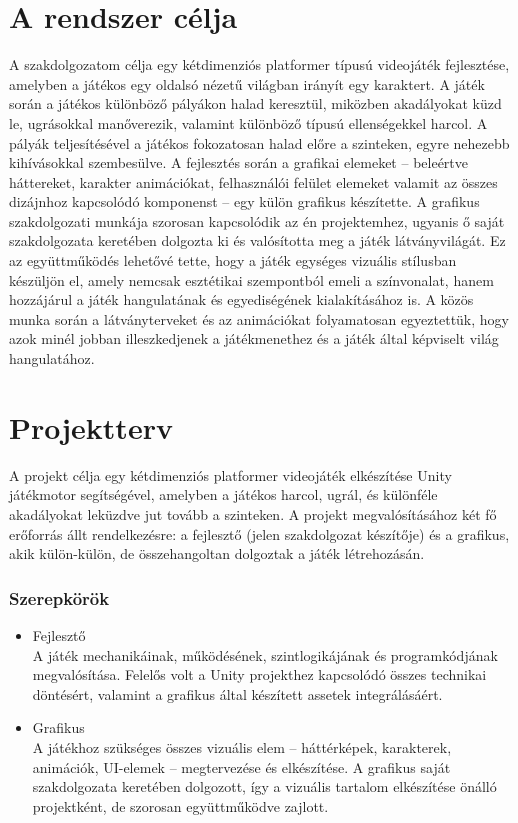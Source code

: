 \documentclass[
]{thesis-ekf}
\theoremstyle{definition}
\theoremstyle{remark}
\begin{document}
\section{A rendszer célja}
A szakdolgozatom célja egy kétdimenziós platformer típusú videojáték fejlesztése, amelyben a játékos egy oldalsó nézetű világban irányít egy karaktert. A játék során a játékos különböző pályákon halad keresztül, miközben akadályokat küzd le, ugrásokkal manőverezik, valamint különböző típusú ellenségekkel harcol. A pályák teljesítésével a játékos fokozatosan halad előre a szinteken, egyre nehezebb kihívásokkal szembesülve.
A fejlesztés során a grafikai elemeket -- beleértve háttereket, karakter animációkat, felhasználói felület elemeket valamit az összes dizájnhoz kapcsolódó komponenst -- egy külön grafikus készítette.  A grafikus szakdolgozati munkája szorosan kapcsolódik az én projektemhez, ugyanis ő saját szakdolgozata keretében dolgozta ki és valósította meg a játék látványvilágát. Ez az együttműködés lehetővé tette, hogy a játék egységes vizuális stílusban készüljön el, amely nemcsak esztétikai szempontból emeli a színvonalat, hanem hozzájárul a játék hangulatának és egyediségének kialakításához is. A közös munka során a látványterveket és az animációkat folyamatosan egyeztettük, hogy azok minél jobban illeszkedjenek a játékmenethez és a játék által képviselt világ hangulatához.
\section{Projektterv}
A projekt célja egy kétdimenziós platformer videojáték elkészítése Unity játékmotor segítségével, amelyben a játékos harcol, ugrál, és különféle akadályokat leküzdve jut tovább a szinteken. A projekt megvalósításához két fő erőforrás állt rendelkezésre: a fejlesztő (jelen szakdolgozat készítője) és a grafikus, akik külön-külön, de összehangoltan dolgoztak a játék létrehozásán.
\subsubsection{Szerepkörök}
\begin{itemize}
	\item Fejlesztő \\A játék mechanikáinak, működésének, szintlogikájának és programkódjának megvalósítása. Felelős volt a Unity projekthez kapcsolódó összes technikai döntésért, valamint a grafikus által készített assetek integrálásáért.
	\item Grafikus \\A játékhoz szükséges összes vizuális elem – háttérképek, karakterek, animációk, UI-elemek – megtervezése és elkészítése. A grafikus saját szakdolgozata keretében dolgozott, így a vizuális tartalom elkészítése önálló projektként, de szorosan együttműködve zajlott.
\end{itemize}
\end{document}
